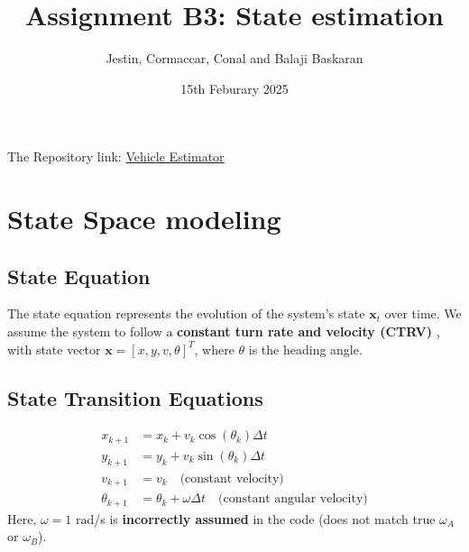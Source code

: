 \documentclass[a4paper,11pt]{article}
\title{Assignment B3: State estimation}
\author{Jestin, Cormaccar, Conal and Balaji Baskaran}
\date{15th Feburary 2025}
\begin{document}
\maketitle
The Repository link: \href{https://github.com/balajibaski/Vehicle_Estimator/tree/main}{Vehicle Estimator}
\section*{State Space modeling}

\subsection*{State Equation}
The state equation represents the evolution of the system's state \( \mathbf{x}_t \) over time. We assume the system to follow a \textbf{ constant turn rate and velocity (CTRV) },  with state vector $\mathbf{x} = [x, y, v, \theta]^T$, where $\theta$ is the heading angle.
\subsection*{State Transition Equations}
\begin{align*}
    x_{k+1} &= x_k + v_k \cos(\theta_k) \Delta t \\
    y_{k+1} &= y_k + v_k \sin(\theta_k) \Delta t \\
    v_{k+1} &= v_k \quad \text{(constant velocity)} \\
    \theta_{k+1} &= \theta_k + \omega \Delta t \quad \text{(constant angular velocity)}
\end{align*}
Here, $\omega = 1$ rad/s is \textbf{incorrectly assumed} in the code (does not match true $\omega_A$ or $\omega_B$).
\end{document}
